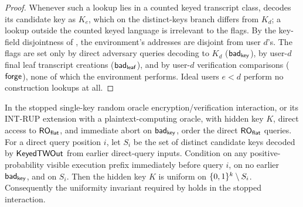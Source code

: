 \begin{proof}
Whenever such a lookup lies in a counted keyed transcript class,
 decodes its candidate key as $K_e$, which on
the distinct-keys branch differs from $K_d$; a lookup outside the
counted keyed language is irrelevant to the flags. By the key-field
disjointness of , the environment's addresses
are disjoint from user $d$'s. The flags are set only by direct
adversary queries decoding to $K_d$ ($\mathsf{bad}_{\mathsf{key}}$), by user-$d$ final leaf
transcript creations ($\mathsf{bad}_{\mathsf{leaf}}$), and by user-$d$ verification
comparisons ($\mathsf{forge}$), none of which the environment performs. Ideal
users $e < d$ perform no construction lookups at all.
\end{proof}

\begin{lemma}
\label{lem:ver-key-uniformity}
In the stopped single-key \TW{} random oracle encryption/verification
interaction, or its \textsf{INT-RUP} extension with a
plaintext-computing oracle, with hidden key $K$, direct access to $\mathsf{RO}_{\mathsf{flat}}$, and
immediate abort on $\mathsf{bad}_{\mathsf{key}}$, order the direct $\mathsf{RO}_{\mathsf{flat}}$ queries. For a
direct query position $i$, let $S_i$
be the set of distinct candidate keys decoded by $\mathsf{KeyedTWOut}$ from
earlier direct-query inputs. Condition on any positive-probability
visible execution prefix immediately before query $i$, on no earlier
$\mathsf{bad}_{\mathsf{key}}$, and on $S_i$. Then the hidden key $K$
is uniform on $\{0,1\}^k \setminus S_i$. Consequently the uniformity
invariant required by  holds in the stopped
interaction.
\end{lemma}

